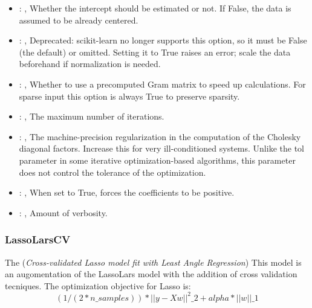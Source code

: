 \begin{itemize}
    \item {}: ,
      Whether the intercept should be estimated or not. If False,
      the data is assumed to be already centered.

    \item {}: ,
      Deprecated: scikit-learn no longer supports this option, so it must be False (the default) or
      omitted.                                                  Setting it to True raises an error;
      scale the data beforehand if normalization is needed.

    \item {}: ,
      Whether to use a precomputed Gram matrix to speed up calculations.
      For sparse input this option is always True to preserve sparsity.

    \item {}: ,
      The maximum number of iterations.

    \item {}: ,
      The machine-precision regularization in the computation of the Cholesky
      diagonal factors. Increase this for very ill-conditioned systems. Unlike the tol
      parameter in some iterative optimization-based algorithms, this parameter does not
      control the tolerance of the optimization.

    \item {}: ,
      When set to True, forces the coefficients to be positive.

    \item {}: ,
      Amount of verbosity.
  \end{itemize}


\subsubsection{LassoLarsCV}
  The  (\textit{Cross-validated Lasso model fit with Least Angle Regression})
  This model is an augomentation of the LassoLars model with the addition of
  cross validation tecniques.                         The optimization objective for Lasso is:
  \begin{equation}                          (1 / (2 * n\_samples)) * ||y - Xw||^2\_2 + alpha *
  ||w||\_1                         \end{equation}

